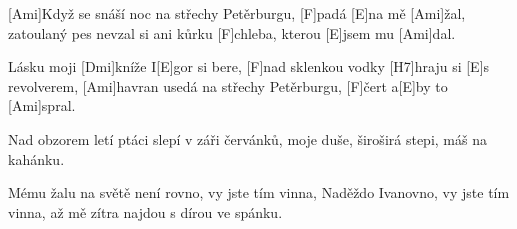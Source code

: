 [Ami]Když se snáší noc na střechy Petěrburgu,
[F]padá [E]na mě [Ami]žal,
zatoulaný pes nevzal si ani kůrku
[F]chleba, kterou [E]jsem mu [Ami]dal.

\brep [C]Lásku moji [Dmi]kníže I[E]gor si bere,
[F]nad sklenkou vodky [H7]hraju si [E]s revolverem,
[Ami]havran usedá na střechy Petěrburgu,
[F]čert a[E]by to [Ami]spral.\erep

Nad obzorem letí ptáci slepí v záři červánků,
moje duše, široširá stepi, máš na kahánku.

\brep Mému žalu na světě není rovno,
vy jste tím vinna, Naděždo Ivanovno,
vy jste tím vinna, až mě zítra najdou s dírou ve spánku.\erep


